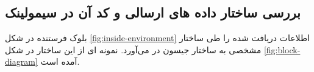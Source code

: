    
\subsection{بررسی ساختار داده های ارسالی  و کد آن در سیمولینک}\label{ch:fani|sec:simulink|sub:json}
   
   بلوک فرستنده در شکل
   \ref{fig:inside-environment}
   اطلاعات دریافت شده را طی ساختار مشخصی به ساختار جیسون در می‌آورد.
   نمونه ای از این ساختار در شکل
   \ref{fig:block-diagram}
    آمده است.
   
   
   
   
  
   
   
   

